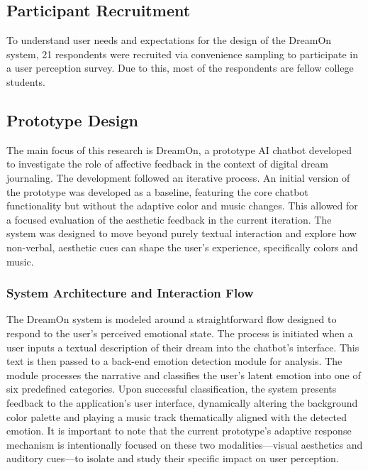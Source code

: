 \documentclass[conference]{IEEEtran}
\begin{document}
	\subsection{Participant Recruitment}
	To understand user needs and expectations for the design of the DreamOn system, 21 respondents were recruited via convenience sampling to participate in a user perception survey. Due to this, most of the respondents are fellow college students.
	
	\subsection{Prototype Design}
	The main focus of this research is DreamOn, a prototype AI chatbot developed to investigate the role of affective feedback in the context of digital dream journaling. The development followed an iterative process. An initial version of the prototype was developed as a baseline, featuring the core chatbot functionality but without the adaptive color and music changes. This allowed for a focused evaluation of the aesthetic feedback in the current iteration. The system was designed to move beyond purely textual interaction and explore how non-verbal, aesthetic cues can shape the user's experience, specifically colors and music.
	
	\subsubsection{System Architecture and Interaction Flow}
	The DreamOn system is modeled around a straightforward flow designed to respond to the user's perceived emotional state. The process is initiated when a user inputs a textual description of their dream into the chatbot's interface. This text is then passed to a back-end emotion detection module for analysis. The module processes the narrative and classifies the user's latent emotion into one of six predefined categories. Upon successful classification, the system presents feedback to the application's user interface, dynamically altering the background color palette and playing a music track thematically aligned with the detected emotion. It is important to note that the current prototype's adaptive response mechanism is intentionally focused on these two modalities—visual aesthetics and auditory cues—to isolate and study their specific impact on user perception.
	
\end{document}

